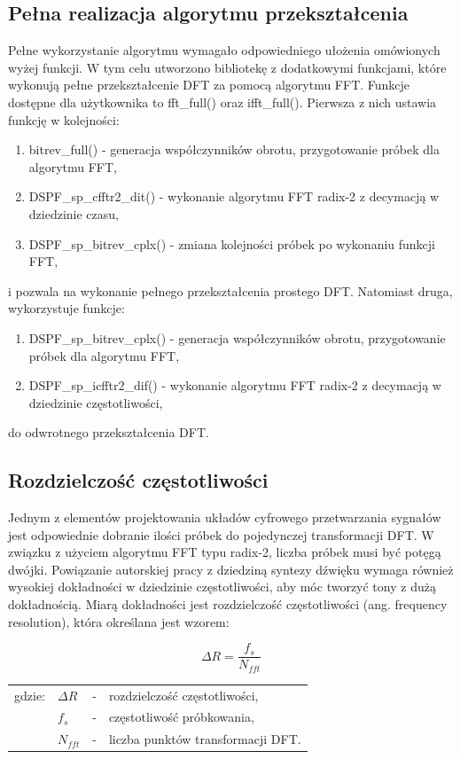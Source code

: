 \subsection{Pełna realizacja algorytmu przekształcenia}
Pełne wykorzystanie algorytmu wymagało odpowiedniego ułożenia omówionych wyżej funkcji. W tym celu utworzono bibliotekę z dodatkowymi funkcjami, które wykonują pełne przekształcenie DFT za pomocą algorytmu FFT. Funkcje dostępne dla użytkownika to fft\_full() oraz ifft\_full(). Pierwsza z nich ustawia funkcję w kolejności:
\begin{enumerate}
	\item bitrev\_full() - generacja współczynników obrotu, przygotowanie próbek dla algorytmu FFT,
	\item DSPF\_sp\_cfftr2\_dit() - wykonanie algorytmu FFT radix-2 z decymacją w dziedzinie czasu,
	\item DSPF\_sp\_bitrev\_cplx() - zmiana kolejności próbek po wykonaniu funkcji FFT,
\end{enumerate}
i pozwala na wykonanie pełnego przekształcenia prostego DFT. Natomiast druga, wykorzystuje funkcje:
\begin{enumerate}
	\item DSPF\_sp\_bitrev\_cplx() - generacja współczynników obrotu, przygotowanie próbek dla algorytmu FFT,
	\item DSPF\_sp\_icfftr2\_dif() - wykonanie algorytmu FFT radix-2 z decymacją w dziedzinie częstotliwości,
\end{enumerate}
do odwrotnego przekształcenia DFT.

\subsection{Rozdzielczość częstotliwości}
Jednym z elementów projektowania układów cyfrowego przetwarzania sygnałów jest odpowiednie dobranie ilości próbek do pojedynczej transformacji DFT. W związku z użyciem algorytmu FFT typu radix-2, liczba próbek musi być potęgą dwójki. Powiązanie autorskiej pracy z dziedziną syntezy dźwięku wymaga również wysokiej dokładności w dziedzinie częstotliwości, aby móc tworzyć tony z dużą dokładnością. Miarą dokładności jest rozdzielczość częstotliwości (ang. frequency resolution), która określana jest wzorem:

\begin{equation} \label{equ:fft_resol}
\Delta R = \frac{f_{s}}{N_{fft}}
\end{equation}
\begin{tabular}{ l l l l}
	gdzie: 	&	$\Delta R$ & - &  rozdzielczość częstotliwości, \\
	&	$f_{s}$ & - &  częstotliwość próbkowania, \\
	&   $N_{fft}$ &  - & liczba punktów transformacji DFT. \\
\end{tabular}

